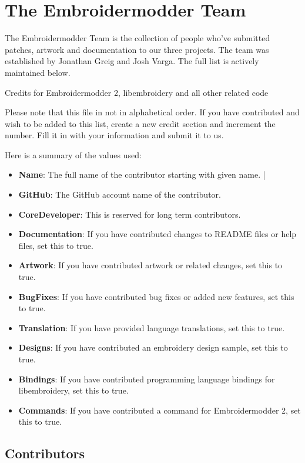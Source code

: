 \section{The Embroidermodder Team}

The Embroidermodder Team is the collection of people who've submitted
patches, artwork and documentation to our three projects.
The team was established by Jonathan Greig and Josh Varga.
The full list is actively maintained below.

Credits for Embroidermodder 2, libembroidery and all other related code

Please note that this file in not in alphabetical order. If you have contributed and wish to be added to this list, create a new credit section and increment the number. Fill it in with your information and submit it to us.

Here is a summary of the values used:

\begin{itemize}
\item \textbf{Name}: The full name of the contributor starting with given name.                                        |
\item \textbf{GitHub}: The GitHub account name of the contributor.
\item \textbf{CoreDeveloper}: This is reserved for long term contributors.
\item \textbf{Documentation}: If you have contributed changes to README files or
    help files, set this to true.
\item \textbf{Artwork}: If you have contributed artwork or related changes, set
    this to true.
\item \textbf{BugFixes}: If you have contributed bug fixes or added new
    features, set this to true.
\item \textbf{Translation}: If you have provided language translations, set this to true.
\item \textbf{Designs}: If you have contributed an embroidery design sample, set this to true.
\item \textbf{Bindings}: If you have contributed programming language
    bindings for libembroidery, set this to true.
\item \textbf{Commands}: If you have contributed a command for Embroidermodder 2, set this to true.
\end{itemize}

\subsection{Contributors}

